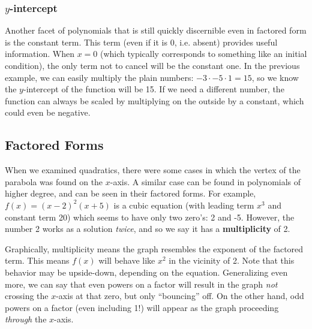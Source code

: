\subsubsection{$y$-intercept}
Another facet of polynomials that is still quickly discernible even in factored form
is the constant term.  This term (even if it is 0, i.e. absent) provides useful information.
When $x=0$ (which typically corresponds to something like an initial condition), the
only term not to cancel will be the constant one.  In the previous example, we can 
easily multiply the plain numbers: $-3 \cdot -5 \cdot 1 = 15$, so we know the
$y$-intercept of the function will be 15.  If we need a different number, the function
can always be scaled by multiplying on the outside by a constant, which could even
be negative.

\subsection{Factored Forms}
When we examined quadratics, there were some cases in which the vertex of the
parabola was found on the $x$-axis.  A similar case can be found in polynomials of
higher degree, and can be seen in their factored forms.  For example,
$f(x)= (x-2)^2(x+5)$ is a cubic equation  (with leading term $x^3$ and constant term
20) which seems to have only two zero's: 2 and -5.  However, the number 2 works as
a solution \emph{twice}, and so we say it has a \textbf{multiplicity} of 2.

Graphically, multiplicity means the graph resembles the exponent of the factored term.
This means $f(x)$ will behave like $x^2$ in the vicinity of 2.  Note that this behavior
may be upside-down, depending on the equation.  Generalizing even more, we can say
that even powers on a factor will result in the graph \emph{not} crossing the $x$-axis
at that zero, but only ``bouncing'' off.  On the other hand, odd powers on a factor
(even including 1!) will appear as the graph proceeding \emph{through} the $x$-axis.

